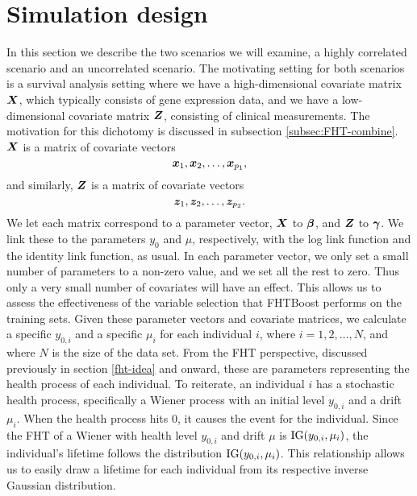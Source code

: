 \section{Simulation design}
In this section we describe the two scenarios we will examine, a highly correlated scenario and an uncorrelated scenario.
The motivating setting for both scenarios is a survival analysis setting where we have a high-dimensional covariate matrix $\bm{X}$, which typically consists of gene expression data, and we have a low-dimensional covariate matrix $\bm{Z}$, consisting of clinical measurements.
The motivation for this dichotomy is discussed in subsection \ref{subsec:FHT-combine}.
$\bm{X}$ is a matrix of covariate vectors
\begin{equation*}
    \bm{x}_1,\bm{x}_2,\ldots,\bm{x}_{p_1},
\end{equation*}
and similarly, $\bm{Z}$ is a matrix of covariate vectors
\begin{equation*}
    \bm{z}_1,\bm{z}_2,\ldots,\bm{z}_{p_2}.
\end{equation*}
We let each matrix correspond to a parameter vector, $\bm{X}$ to $\boldsymbol{\beta}$, and $\bm{Z}$ to $\boldsymbol{\gamma}$.
We link these to the parameters $y_0$ and $\mu$, respectively, with the log link function and the identity link function, as usual.
In each parameter vector, we only set a small number of parameters to a non-zero value, and we set all the rest to zero.
Thus only a very small number of covariates will have an effect.
This allows us to assess the effectiveness of the variable selection that FHTBoost performs on the training sets.
Given these parameter vectors and covariate matrices, we calculate a specific $y_{0,i}$ and a specific $\mu_i$ for each individual $i$, where $i=1,2,\ldots,N$, and where $N$ is the size of the data set.
From the FHT perspective, discussed previously in section \ref{fht-idea} and onward, these are parameters representing the health process of each individual.
To reiterate, an individual $i$ has a stochastic health process, specifically a Wiener process with an initial level $y_{0,i}$ and a drift $\mu_i$.
When the health process hits 0, it causes the event for the individual.
Since the FHT of a Wiener with health level $y_{0,i}$ and drift $\mu$ is $\operatorname{IG}(y_{0,i},\mu_i)$, the individual's lifetime follows the distribution $\operatorname{IG}(y_{0,i},\mu_i)$.
This relationship allows us to easily draw a lifetime for each individual from its respective inverse Gaussian distribution.

